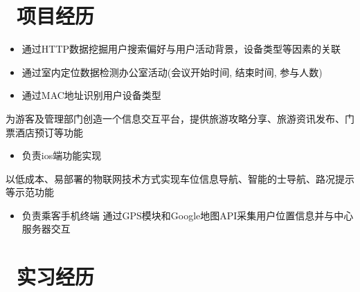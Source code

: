 \documentclass{resume}
\begin{document}
\section{\faUsers\ 项目经历}
\begin{onehalfspacing}
\begin{itemize}
  \item 通过HTTP数据挖掘用户搜索偏好与用户活动背景，设备类型等因素的关联
  \item 通过室内定位数据检测办公室活动(会议开始时间, 结束时间, 参与人数)
  \item 通过MAC地址识别用户设备类型
\end{itemize}
\end{onehalfspacing}

\begin{onehalfspacing}
为游客及管理部门创造一个信息交互平台，提供旅游攻略分享、旅游资讯发布、门票酒店预订等功能
\begin{itemize}
	\item 负责ios端功能实现
\end{itemize}
\end{onehalfspacing}
\begin{onehalfspacing}
以低成本、易部署的物联网技术方式实现车位信息导航、智能的士导航、路况提示等示范功能
\begin{itemize}
  \item 负责乘客手机终端  通过GPS模块和Google地图API采集用户位置信息并与中心服务器交互
\end{itemize}
\end{onehalfspacing}


\section{\faUsers\ 实习经历}
\end{document}
